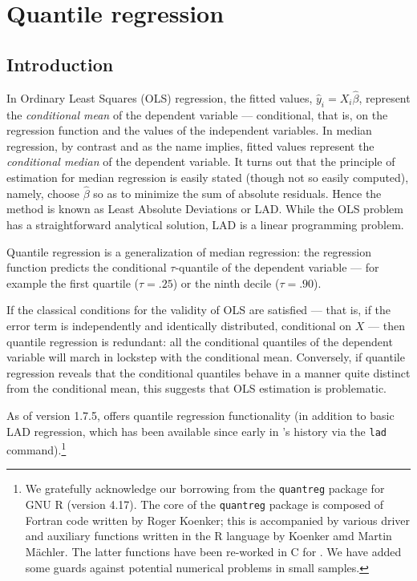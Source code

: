 \chapter{Quantile regression}
\label{chap:quantreg}

\section{Introduction}
\label{sec:rq-intro}

In Ordinary Least Squares (OLS) regression, the fitted values,
$\hat{y}_i = X_i\hat{\beta}$, represent the \emph{conditional mean} of
the dependent variable --- conditional, that is, on the regression
function and the values of the independent variables.  In median
regression, by contrast and as the name implies, fitted values
represent the \emph{conditional median} of the dependent variable.  It
turns out that the principle of estimation for median regression is
easily stated (though not so easily computed), namely, choose
$\hat{\beta}$ so as to minimize the sum of absolute residuals.  Hence
the method is known as Least Absolute Deviations or LAD.  While the OLS
problem has a straightforward analytical solution, LAD is a linear
programming problem.

Quantile regression is a generalization of median regression: the
regression function predicts the conditional $\tau$-quantile of the
dependent variable --- for example the first quartile ($\tau = .25$)
or the ninth decile ($\tau = .90$).

If the classical conditions for the validity of OLS are satisfied ---
that is, if the error term is independently and identically
distributed, conditional on $X$ --- then quantile regression is
redundant: all the conditional quantiles of the dependent variable
will march in lockstep with the conditional mean.  Conversely, if
quantile regression reveals that the conditional quantiles behave in a
manner quite distinct from the conditional mean, this suggests that
OLS estimation is problematic.

As of version 1.7.5,  offers quantile regression
functionality (in addition to basic LAD regression, which has been
available since early in 's history via the \texttt{lad}
command).\footnote{We gratefully acknowledge our borrowing from the
  \texttt{quantreg} package for GNU \textsf{R} (version 4.17).  The
  core of the \texttt{quantreg} package is composed of Fortran code
  written by Roger Koenker; this is accompanied by various driver and
  auxiliary functions written in the \textsf{R} language by Koenker
  amd Martin M\"achler.  The latter functions have been re-worked in C
  for .  We have added some guards against potential
  numerical problems in small samples.}

